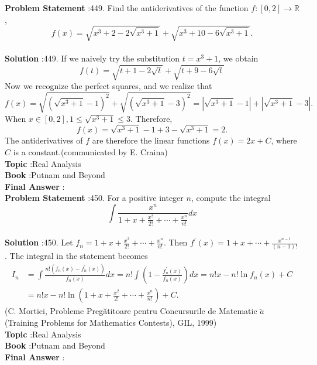 \documentclass[10pt]{article}
\begin{document}
\textbf{Problem Statement} :449. Find the antiderivatives of the function $f:[0,2] \rightarrow \mathbb{R}$,$$ f(x)=\sqrt{x^{3}+2-2 \sqrt{x^{3}+1}}+\sqrt{x^{3}+10-6 \sqrt{x^{3}+1}} . $$\\
\textbf{Solution} :449. If we naively try the substitution $t=x^{3}+1$, we obtain$$ f(t)=\sqrt{t+1-2 \sqrt{t}}+\sqrt{t+9-6 \sqrt{t}} $$Now we recognize the perfect squares, and we realize that$$ f(x)=\sqrt{\left(\sqrt{x^{3}+1}-1\right)^{2}}+\sqrt{\left(\sqrt{x^{3}+1}-3\right)^{2}}=\left|\sqrt{x^{3}+1}-1\right|+\left|\sqrt{x^{3}+1}-3\right| . $$When $x \in[0,2], 1 \leq \sqrt{x^{3}+1} \leq 3$. Therefore,$$ f(x)=\sqrt{x^{3}+1}-1+3-\sqrt{x^{3}+1}=2 . $$The antiderivatives of $f$ are therefore the linear functions $f(x)=2 x+C$, where $C$ is a constant.(communicated by E. Craina)\\
\textbf{Topic} :Real Analysis\\
\textbf{Book} :Putnam and Beyond\\
\textbf{Final Answer} :\\


\textbf{Problem Statement} :450. For a positive integer $n$, compute the integral$$ \int \frac{x^{n}}{1+x+\frac{x^{2}}{2 !}+\cdots+\frac{x^{n}}{n !}} d x $$\\
\textbf{Solution} :450. Let $f_{n}=1+x+\frac{x^{2}}{2 !}+\cdots+\frac{x^{n}}{n !}$. Then $f^{\prime}(x)=1+x+\cdots+\frac{x^{n-1}}{(n-1) !}$. The integral in the statement becomes $$ \begin{aligned} I_{n} &=\int \frac{n !\left(f_{n}(x)-f_{n}^{\prime}(x)\right)}{f_{n}(x)} d x=n ! \int\left(1-\frac{f_{n}^{\prime}(x)}{f_{n}(x)}\right) d x=n ! x-n ! \ln f_{n}(x)+C \\ &=n ! x-n ! \ln \left(1+x+\frac{x^{2}}{2 !}+\cdots+\frac{x^{n}}{n !}\right)+C . \end{aligned} $$(C. Mortici, Probleme Pregătitoare pentru Concursurile de Matematic $\breve{a}$ (Training Problems for Mathematics Contests), GIL, 1999)\\
\textbf{Topic} :Real Analysis\\
\textbf{Book} :Putnam and Beyond\\
\textbf{Final Answer} :\\
\end{document}
